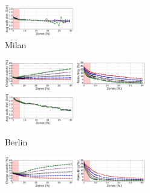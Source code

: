 \begin{figure}[t!]
\begin{center}
\begin{subfigure}{\textwidth}
            \includegraphics[width=0.33\textwidth]{figures/cut_Milano_AvgWalkedDistanceVsZones_Policy_44_tt-25_100_4.pdf}
             \caption{Milan}
             \label{fig:zone_vs_metric_milano}
         \end{subfigure}
         \begin{subfigure}{\textwidth}
         	\includegraphics[width=0.33\textwidth]{figures/cut_Berlino_AmountRechargePercVsZones_Policy_44_tt-25_100_4.pdf}
            \includegraphics[width=0.33\textwidth]{figures/cut_Berlino_ReroutePercVsZones_Policy_44_tt-25_100_4.pdf}
            \includegraphics[width=0.33\textwidth]{figures/cut_Berlino_AvgWalkedDistanceVsZones_Policy_44_tt-25_100_4.pdf}
             \caption{Berlin}
             \label{fig:zone_vs_metric_berlino}
         \end{subfigure}
         \begin{subfigure}{\textwidth}
        	\includegraphics[width=0.33\textwidth]{figures/cut_Vancouver_AmountRechargePercVsZones_Policy_44_tt-25_100_4.pdf}
            \includegraphics[width=0.33\textwidth]{figures/cut_Vancouver_ReroutePercVsZones_Policy_44_tt-25_100_4.pdf}

\end{subfigure}
\end{center}
\end{figure}
